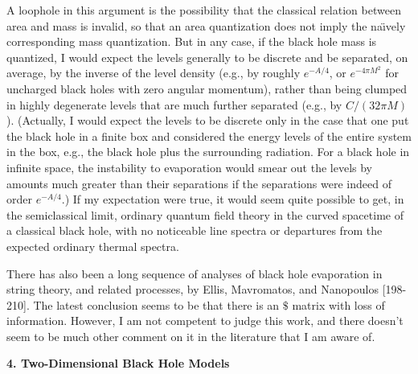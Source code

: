 \documentclass[12pt]{article}
\begin{document}
     A loophole in this argument is the possibility that the
classical relation
between area and mass is invalid, so that an area quantization does
not
imply the na\"{\i}vely corresponding mass quantization.  But in any
case,
if the black hole mass is quantized,
I would expect the levels generally to be discrete and be separated,
on
average, by the inverse of the level density (e.g., by roughly
$e^{-A/4}$,
or $e^{-4\pi M^2}$ for uncharged black holes with zero angular
momentum),
rather than being clumped in highly degenerate levels that are much
further
separated (e.g., by $C/(32\pi M)$).  (Actually, I would expect the
levels
to be discrete only in the case that one put the black hole in a
finite box and
considered the energy levels of the entire system in the box, e.g.,
the
black hole plus the surrounding radiation.  For a black hole in
infinite space,
the instability to evaporation would smear out the levels by amounts
much greater than their separations if the separations were indeed of
order
$e^{-A/4}$.)  If my expectation were true, it would seem quite
possible to
get, in the semiclassical limit, ordinary quantum field theory in the
curved
spacetime of a classical black hole, with no noticeable line spectra
or
departures from the expected ordinary thermal spectra.

     There has also been a long sequence of analyses of black hole
evaporation
in string theory, and related processes, by Ellis, Mavromatos, and
Nanopoulos
[198-210].
The latest conclusion seems to be \cite{EMN13} that there is an $\$$
matrix
with loss of information.  However, I am not competent to judge this
work,
and there doesn't seem to be much other comment on it in the
literature that
I am aware of.

\vspace{5 mm}
{\bf 4.  Two-Dimensional Black Hole Models}
\vspace{5 mm}
\end{document}
